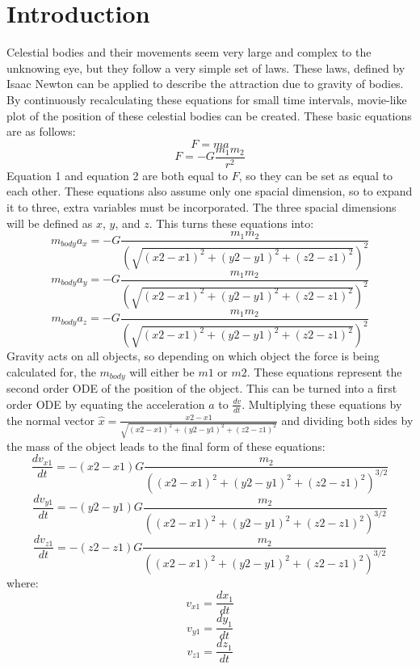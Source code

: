 \documentclass[10pt]{article}
\begin{document}
\section{Introduction}\label{Sec_Introduction}
Celestial bodies and their movements seem very large and complex to the unknowing eye, but they follow a very simple set of laws. These laws, defined by Isaac Newton can be applied to describe the attraction due to gravity of bodies. By continuously recalculating these equations for small time intervals, movie-like plot of the position of these celestial bodies can be created. These basic equations are as follows:
\begin{equation}
	F = ma
\end{equation}
\begin{equation}
	F = -G \frac{m_1 m_2}{r^2}
\end{equation}
Equation 1 and equation 2 are both equal to $F$, so they can be set as equal to each other. These equations also assume only one spacial dimension, so to expand it to three, extra variables must be incorporated. The three spacial dimensions will be defined as $x$, $y$, and $z$. This turns these equations into:
\begin{equation}
	m_{body} a_x = -G \frac{m_1 m_2}{(\sqrt{(x2-x1)^2 + (y2-y1)^2 + (z2-z1)^2})^2}
\end{equation}
\begin{equation}
	m_{body} a_y = -G \frac{m_1 m_2}{(\sqrt{(x2-x1)^2 + (y2-y1)^2 + (z2-z1)^2})^2}
\end{equation}
\begin{equation}
	m_{body} a_z = -G \frac{m_1 m_2}{(\sqrt{(x2-x1)^2 + (y2-y1)^2 + (z2-z1)^2})^2}
\end{equation}
Gravity acts on all objects, so depending on which object the force is being calculated for, the $m_{body}$ will either be $m1$ or $m2$. These equations represent the second order ODE of the position of the object. This can be turned into a first order ODE by equating the acceleration $a$ to $\frac{dv}{dt}$. Multiplying these equations by the normal vector $\hat{x} = \frac{x2-x1}{\sqrt{(x2-x1)^2 + (y2-y1)^2 + (z2-z1)^2}}$ and dividing both sides by the mass of the object leads to the final form of these equations:
\begin{equation}
	\frac{dv_{x1}}{dt} = -(x2-x1)G \frac{m_2}{((x2-x1)^2 + (y2-y1)^2 + (z2-z1)^2)^{3/2}}
\end{equation}
\begin{equation}
	\frac{dv_{y1}}{dt} = -(y2-y1)G \frac{m_2}{((x2-x1)^2 + (y2-y1)^2 + (z2-z1)^2)^{3/2}}
\end{equation}
\begin{equation}
	\frac{dv_{z1}}{dt} = -(z2-z1)G \frac{m_2}{((x2-x1)^2 + (y2-y1)^2 + (z2-z1)^2)^{3/2}}
\end{equation}
where:
\begin{equation}
	v_{x1} = \frac{dx_{1}}{dt}
\end{equation}
\begin{equation}
	v_{y1} = \frac{dy_{1}}{dt}
\end{equation}
\begin{equation}
	v_{z1} = \frac{dz_{1}}{dt}
\end{equation}
\end{document}
